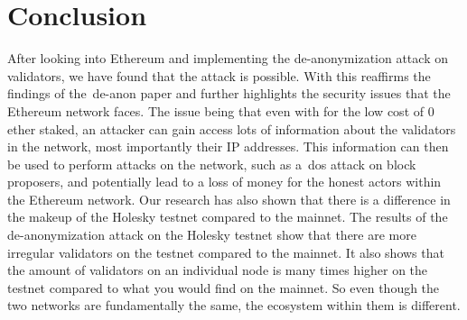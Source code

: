 

\section{Conclusion}\label{sec:conclusion}
After looking into Ethereum and implementing the de-anonymization attack on validators, we have found that the attack is possible.
With this reaffirms the findings of the~\gls{de-anon paper} and further highlights the security issues that the Ethereum network faces.
The issue being that even with for the low cost of 0 ether staked, an attacker can gain access lots of information about the validators in the network, most importantly their IP addresses.
This information can then be used to perform attacks on the network, such as a~\gls{dos} attack on block proposers, and potentially lead to a loss of money for the honest actors within the Ethereum network.
Our research has also shown that there is a difference in the makeup of the Holesky testnet compared to the mainnet.
The results of the de-anonymization attack on the Holesky testnet show that there are more irregular validators on the testnet compared to the mainnet.
It also shows that the amount of validators on an individual node is many times higher on the testnet compared to what you would find on the mainnet.
So even though the two networks are fundamentally the same, the ecosystem within them is different.